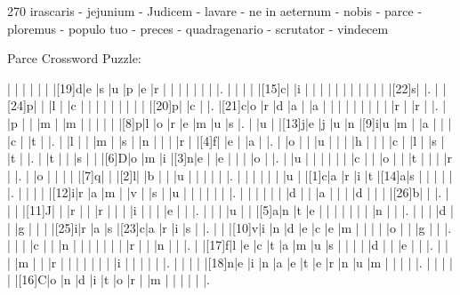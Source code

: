 \documentclass[12pt]{article}
\begin{document}
\pagestyle{fancy}
\fancyhf{}
\renewcommand{\headrulewidth}{0pt}
\renewcommand{\footrulewidth}{0pt}
\libertine
\renewcommand\PuzzleClueFont{\rm\normalsize}
\noindent\begin{rotate}{0}
\small
\end{rotate}
\hfill
\begin{rotate}{270}
\small
irascaris - jejunium - Judicem - lavare - ne in aeternum - nobis - parce - ploremus - populo tuo - preces - quadragenario - scrutator - vindecem
\end{rotate}
\begin{center}
  \huge{Parce Crossword Puzzle:}
\end{center}
\vspace{1.5cm}
\begin{Puzzle}{22}{24}
  |{}  |{}  |{}  |{}  |{}  |{}  |[19]d|e   |s   |u   |p   |e   |r   |{}  |{}  |{}  |{}  |{}  |{}  |{}  |.
  |{}  |{}  |{}  |{}  |[15]c|{}  |i   |{}  |{}  |{}  |{}  |{}  |{}  |{}  |{}  |{}  |{}  |{}  |[22]s|{}  |.
  |{}  |[24]p|{}  |{}  |l   |{}  |c   |{}  |{}  |{}  |{}  |{}  |{}  |{}  |{}  |{}  |[20]p|{}  |c   |{}  |.
  |[21]c|o   |r   |d   |a   |{}  |a   |{}  |{}  |{}  |{}  |{}  |{}  |{}  |{}  |{}  |r   |{}  |r   |{}  |.
  |{}  |p   |{}  |{}  |m   |{}  |m   |{}  |{}  |{}  |{}  |{}  |[8]p|l   |o   |r   |e   |m   |u   |s   |.
  |{}  |u   |{}  |[13]j|e   |j   |u   |n   |[9]i|u   |m   |{}  |a   |{}  |{}  |{}  |c   |{}  |t   |{}  |.
  |{}  |l   |{}  |{}  |m   |{}  |s   |{}  |n   |{}  |{}  |{}  |r   |{}  |[4]f|{}  |e   |{}  |a   |{}  |.
  |{}  |o   |{}  |{}  |u   |{}  |{}  |{}  |h   |{}  |{}  |{}  |c   |{}  |l   |{}  |s   |{}  |t   |{}  |.
  |{}  |t   |{}  |{}  |s   |{}  |{}  |[6]D|o   |m   |i   |[3]n|e   |{}  |e   |{}  |{}  |{}  |o   |{}  |.
  |{}  |u   |{}  |{}  |{}  |{}  |{}  |{}  |c   |{}  |{}  |o   |{}  |{}  |t   |{}  |{}  |{}  |r   |{}  |.
  |{}  |o   |{}  |{}  |{}  |{}  |[7]q|{}  |{}  |[2]l|{}  |b   |{}  |{}  |u   |{}  |{}  |{}  |{}  |{}  |.
  |{}  |{}  |{}  |{}  |{}  |{}  |u   |{}  |[1]c|a   |r   |i   |t   |[14]a|s   |{}  |{}  |{}  |{}  |{}  |.
  |{}  |{}  |{}  |{}  |[12]i|r   |a   |m   |{}  |v   |{}  |s   |{}  |u   |{}  |{}  |{}  |{}  |{}  |{}  |.
  |{}  |{}  |{}  |{}  |{}  |{}  |d   |{}  |{}  |a   |{}  |{}  |{}  |d   |{}  |{}  |{}  |[26]b|{}  |{}  |.
  |{}  |{}  |{}  |[11]J|{}  |{}  |r   |{}  |{}  |r   |{}  |{}  |{}  |i   |{}  |{}  |{}  |e   |{}  |{}  |.
  |{}  |{}  |{}  |u   |{}  |{}  |[5]a|n   |t   |e   |{}  |{}  |{}  |{}  |{}  |{}  |{}  |n   |{}  |{}  |.
  |{}  |{}  |{}  |d   |{}  |{}  |g   |{}  |{}  |{}  |[25]i|r   |a   |s   |[23]c|a   |r   |i   |s   |{}  |.
  |{}  |{}  |[10]v|i   |n   |d   |e   |c   |e   |m   |{}  |{}  |{}  |{}  |o   |{}  |{}  |g   |{}  |{}  |.
  |{}  |{}  |{}  |c   |{}  |{}  |n   |{}  |{}  |{}  |{}  |{}  |{}  |{}  |r   |{}  |{}  |n   |{}  |{}  |.
  |{}  |[17]f|l   |e   |c   |t   |a   |m   |u   |s   |{}  |{}  |{}  |{}  |d   |{}  |{}  |e   |{}  |{}  |.
  |{}  |{}  |{}  |m   |{}  |{}  |r   |{}  |{}  |{}  |{}  |{}  |{}  |{}  |i   |{}  |{}  |{}  |{}  |{}  |.
  |{}  |{}  |{}  |{}  |[18]n|e   |i   |n   |a   |e   |t   |e   |r   |n   |u   |m   |{}  |{}  |{}  |{}  |.
  |{}  |{}  |{}  |{}  |{}  |[16]C|o   |n   |d   |i   |t   |o   |r   |{}  |m   |{}  |{}  |{}  |{}  |{}  |.
\end{Puzzle}
\end{document}
